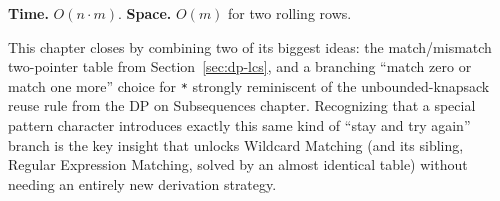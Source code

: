 \begin{complexitybox}
\textbf{Time.} $O(n \cdot m)$.
\textbf{Space.} $O(m)$ for two rolling rows.
\end{complexitybox}

\begin{takeawaybox}
This chapter closes by combining two of its biggest ideas: the
match/mismatch two-pointer table from Section~\ref{sec:dp-lcs}, and a
branching ``match zero or match one more'' choice for \texttt{*}
strongly reminiscent of the unbounded-knapsack reuse rule from the DP on
Subsequences chapter. Recognizing that a special pattern character
introduces exactly this same kind of ``stay and try again'' branch is
the key insight that unlocks Wildcard Matching (and its sibling,
Regular Expression Matching, solved by an almost identical table) without
needing an entirely new derivation strategy.
\end{takeawaybox}
